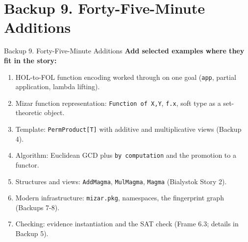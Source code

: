 \documentclass[aspectratio=169,11pt]{beamer}
\begin{document}
\section{Backup 9. Forty-Five-Minute Additions}
\begin{frame}[fragile,t]{Backup 9. Forty-Five-Minute Additions}
\smallskip
\textbf{Add selected examples where they fit in the story:}
\begin{enumerate}
\setlength{\itemsep}{1pt}
\setlength{\parsep}{0pt}
\setlength{\parskip}{0pt}
\item HOL-to-FOL function encoding worked through on one goal (\texttt{app}, partial application, lambda lifting).
\item Mizar function representation: \texttt{Function of X,Y}, \texttt{f.x}, soft type as a set-theoretic object.
\item Template: \texttt{PermProduct[T]} with additive and multiplicative views (Backup 4).
\item Algorithm: Euclidean GCD plus \texttt{by computation} and the promotion to a functor.
\item Structures and views: \texttt{AddMagma}, \texttt{MulMagma}, \texttt{Magma} (Bialystok Story 2).
\item Modern infrastructure: \texttt{mizar.pkg}, namespaces, the fingerprint graph (Backups 7-8).
\item Checking: evidence instantiation and the SAT check (Frame 6.3; details in Backup 5).
\end{enumerate}
\end{frame}
\end{document}
